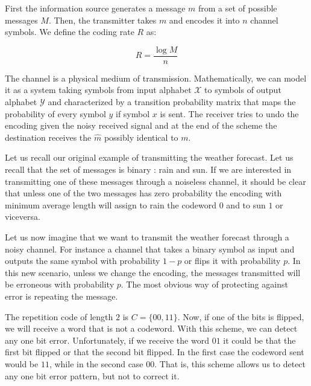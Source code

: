 First the information source generates a message $m$ from a set of possible messages $M$. Then, the transmitter takes $m$ and encodes it into $n$ channel symbols. We define the coding rate $R$ as:

\begin{equation}
R=\frac{\log M}{n}
\end{equation}

The channel is a physical medium of transmission. Mathematically, we can model it as a system taking symbols from input alphabet $\mathcal{X}$ to symbols of output alphabet $\mathcal{Y}$ and characterized by a transition probability matrix that maps the probability of every symbol $y$ if symbol $x$ is sent. The receiver tries to undo the encoding given the noisy received signal and at the end of the scheme the destination receives the ${\hat{m}}$ possibly identical to $m$.

Let us recall our original example of transmitting the weather forecast. Let us recall that the set of messages is binary : rain and sun. If we are interested in transmitting one of these messages through a noiseless channel, it should be clear that unless one of the two messages has zero probability the encoding with minimum average length will assign to rain the codeword $0$ and to sun $1$ or viceversa. 

Let us now imagine that we want to transmit the weather forecast through a noisy channel. For instance a channel that takes a binary symbol as input and outputs the same symbol with probability $1-p$ or flips it with probability $p$. In this new scenario, unless we change the encoding, the messages transmitted will be erroneous with probability $p$. The most obvious way of protecting against error is repeating the message. 

The repetition code of length $2$ is $C=\{00,11\}$. Now, if one of the bits is flipped, we will receive a word that is not a codeword. With this scheme, we can detect any one bit error. Unfortunately, if we receive the word $01$ it could be that the first bit flipped or that the second bit flipped. In the first case the codeword sent would be $11$, while in the second case $00$. That is, this scheme allows us to detect any one bit error pattern, but not to correct it.

